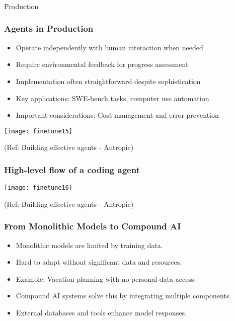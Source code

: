 \begin{frame}[fragile]\frametitle{}
\begin{center}
{\Large Production}
\end{center}
\end{frame}

\begin{frame}[fragile]\frametitle{Agents in Production}
    \begin{itemize}
        \item Operate independently with human interaction when needed
        \item Require environmental feedback for progress assessment
        \item Implementation often straightforward despite sophistication
        \item Key applications: SWE-bench tasks, computer use automation
        \item Important considerations: Cost management and error prevention
    \end{itemize}
	
	\begin{center}
	\texttt{[image: finetune15]}
	\end{center}

	{\tiny (Ref: Building effective agents - Antropic)}		
\end{frame}

\begin{frame}[fragile]\frametitle{High-level flow of a coding agent}

	\begin{center}
	\texttt{[image: finetune16]}
	\end{center}

	{\tiny (Ref: Building effective agents - Antropic)}		
\end{frame}



\begin{frame}[fragile]\frametitle{From Monolithic Models to Compound AI}
    \begin{itemize}
        \item Monolithic models are limited by training data.
        \item Hard to adapt without significant data and resources.
        \item Example: Vacation planning with no personal data access.
        \item Compound AI systems solve this by integrating multiple components.
        \item External databases and tools enhance model responses.
    \end{itemize}
\end{frame}

